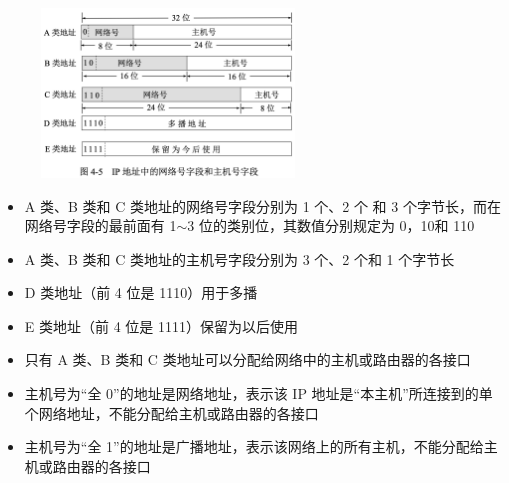 \documentclass[cs4size,a4paper,10pt]{ctexart}
\begin{document}
	\begin{figure}[H]
		\centering
		\includegraphics[width=0.6\textwidth]{img/4.5}
	\end{figure}
	\begin{itemize}
		\item A 类、B 类和 C 类地址的网络号字段分别为 1 个、2 个 和 3 个字节长，而在网络号字段的最前面有 1$\sim$3 位的类别位，其数值分别规定为 0，10和 110
		\item A 类、B 类和 C 类地址的主机号字段分别为 3 个、2 个和 1 个字节长
		\item D 类地址（前 4 位是 1110）用于多播
		\item E 类地址（前 4 位是 1111）保留为以后使用
		\item 只有 A 类、B 类和 C 类地址可以分配给网络中的主机或路由器的各接口
		\item 主机号为“全 0”的地址是网络地址，表示该 IP 地址是“本主机”所连接到的单个网络地址，不能分配给主机或路由器的各接口
		\item 主机号为“全 1”的地址是广播地址，表示该网络上的所有主机，不能分配给主机或路由器的各接口
	\end{itemize}
\end{document}

